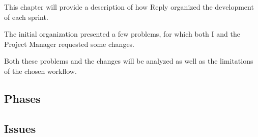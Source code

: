 This chapter will provide a description of how Reply organized the development of each sprint.

The initial organization presented a few problems, for which both I and the Project Manager requested some changes.

Both these problems and the changes will be analyzed as well as the limitations of the chosen workflow.

\subsection{Phases}
    
\subsection{Issues}
    
    
